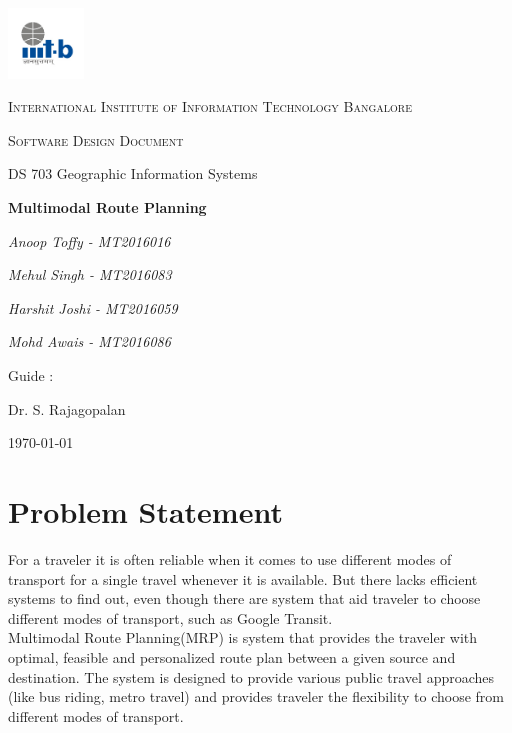 \documentclass[12pt,a4paper]{article}
\begin{document}
\begin{titlepage}
	\centering
	\includegraphics[width=0.15\textwidth]{IIIT-B_logo.jpg}\par\vspace{1cm}
	{\scshape\LARGE International Institute of Information Technology Bangalore \par}
	\vspace{1cm}
	{\scshape\Large Software Design Document\par}
	{\Large DS 703 Geographic Information Systems\par}
	\vspace{1.5cm}
	{\huge\bfseries Multimodal Route Planning\par}
	\vspace{2cm}	   
	{\Large\itshape Anoop Toffy - MT2016016\par}
	{\Large\itshape Mehul Singh - MT2016083\par}		 
	{\Large\itshape Harshit Joshi - MT2016059\par}	 
	{\Large\itshape Mohd Awais - MT2016086\par}
	\vfill
	Guide : \par
	Dr. S. Rajagopalan

	\vfill

	{\large \today\par}
\end{titlepage}


\tableofcontents
\listoffigures
\listoftables
\newpage

\section{Problem Statement}
For a traveler it is often reliable when it comes to use different modes of transport for a single travel whenever it is available. But there lacks efficient systems to find out, even though there are system that aid traveler to choose different modes of transport, such as Google Transit. \\
Multimodal Route Planning(MRP) is system that provides the traveler with optimal, feasible and personalized route plan between a given source and destination. The system is designed to provide various public travel approaches (like bus riding, metro travel) and provides traveler the flexibility to choose from different modes of transport.
\end{document}
